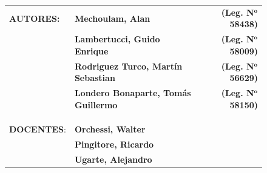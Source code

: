 \begin{titlepage}
\begin{figure}[H]
\begin{adjustwidth}{-1cm}{}
\begin{tabular}{llr} 
	\textbf{AUTORES:} & \textbf{Mechoulam, Alan}  &  \textbf{(Leg. N}$\mathbf{^o}$ \textbf{58438)}\\
	 & \textbf{Lambertucci, Guido Enrique} & \textbf{(Leg. N}$\mathbf{^o}$ \textbf{58009)} \\
	 & \textbf{Rodriguez Turco, Martín Sebastian} & \textbf{(Leg. N}$\mathbf{^o}$ \textbf{56629)} \\
	 & \textbf{Londero Bonaparte, Tomás Guillermo} & \textbf{(Leg. N}$\mathbf{^o}$ \textbf{58150)} \\
 &  & \\
 &  & \\
 &  & \\
	\textbf{DOCENTES}: & \textbf{Orchessi, Walter} & \\
	 & \textbf{Pingitore, Ricardo} & \\
	 & \textbf{Ugarte, Alejandro} & \\
\end{tabular}
\end{adjustwidth}
\end{figure}

\end{titlepage}
